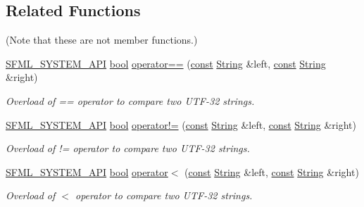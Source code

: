 \subsection*{Related Functions}
(Note that these are not member functions.) \begin{DoxyCompactItemize}
\item 
\hyperlink{sfml_2dep_2_s_f_m_l-2_84_82_2include_2_s_f_m_l_2_system_2_export_8hpp_a6476c9e422606477a4c23d92b1d79a1f}{S\-F\-M\-L\-\_\-\-S\-Y\-S\-T\-E\-M\-\_\-\-A\-P\-I} \hyperlink{term__entry_8h_a002004ba5d663f149f6c38064926abac}{bool} \hyperlink{classsf_1_1_string_a2a385459fa9a237e61a712fa956d489e}{operator==} (\hyperlink{term__entry_8h_a57bd63ce7f9a353488880e3de6692d5a}{const} \hyperlink{classsf_1_1_string}{String} \&left, \hyperlink{term__entry_8h_a57bd63ce7f9a353488880e3de6692d5a}{const} \hyperlink{classsf_1_1_string}{String} \&right)
\begin{DoxyCompactList}\small\item\em Overload of == operator to compare two U\-T\-F-\/32 strings. \end{DoxyCompactList}\item 
\hyperlink{sfml_2dep_2_s_f_m_l-2_84_82_2include_2_s_f_m_l_2_system_2_export_8hpp_a6476c9e422606477a4c23d92b1d79a1f}{S\-F\-M\-L\-\_\-\-S\-Y\-S\-T\-E\-M\-\_\-\-A\-P\-I} \hyperlink{term__entry_8h_a002004ba5d663f149f6c38064926abac}{bool} \hyperlink{classsf_1_1_string_a2b592c36be218b4811795fdc84eecc69}{operator!=} (\hyperlink{term__entry_8h_a57bd63ce7f9a353488880e3de6692d5a}{const} \hyperlink{classsf_1_1_string}{String} \&left, \hyperlink{term__entry_8h_a57bd63ce7f9a353488880e3de6692d5a}{const} \hyperlink{classsf_1_1_string}{String} \&right)
\begin{DoxyCompactList}\small\item\em Overload of != operator to compare two U\-T\-F-\/32 strings. \end{DoxyCompactList}\item 
\hyperlink{sfml_2dep_2_s_f_m_l-2_84_82_2include_2_s_f_m_l_2_system_2_export_8hpp_a6476c9e422606477a4c23d92b1d79a1f}{S\-F\-M\-L\-\_\-\-S\-Y\-S\-T\-E\-M\-\_\-\-A\-P\-I} \hyperlink{term__entry_8h_a002004ba5d663f149f6c38064926abac}{bool} \hyperlink{classsf_1_1_string_ac2ca5a7703402a2bbafd85eec6d1e846}{operator$<$} (\hyperlink{term__entry_8h_a57bd63ce7f9a353488880e3de6692d5a}{const} \hyperlink{classsf_1_1_string}{String} \&left, \hyperlink{term__entry_8h_a57bd63ce7f9a353488880e3de6692d5a}{const} \hyperlink{classsf_1_1_string}{String} \&right)
\begin{DoxyCompactList}\small\item\em Overload of $<$ operator to compare two U\-T\-F-\/32 strings. \end{DoxyCompactList}\item 

\end{DoxyCompactItemize}
